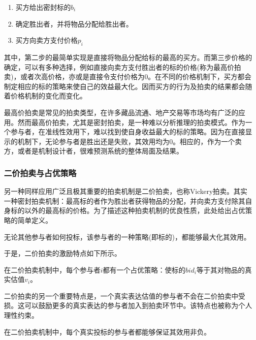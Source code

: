\documentclass[promaster]{thesis-uestc}
\begin{document}
\begin{enumerate}
    \item 买方给出密封标的$b_i$
    \item 确定胜出者，并将物品分配给胜出者。
    \item 买方向卖方支付价格$p_i$
\end{enumerate} 

其中，第二步的最简单实现是直接将物品分配给标的最高的买方。而第三步价格的确定，可以有多种选择，例如直接向卖方支付胜出者的标的价格(称为最高价拍卖)，或者次高价格，亦或是直接令支付价格为0。在不同的价格机制下，买方都会制定相应的标的策略来使自己的效益最大化。因而买方的行为及拍卖的结果都会随着价格机制的变化而变化。

最高价拍卖是常见的拍卖类型，在许多藏品流通、地产交易等市场均有广泛的应用。然而最高价拍卖，尤其是密封拍卖，是一种难以分析推理的拍卖模式。作为一个参与者，在准线性效用下，难以找到使自身收益最大的标的策略。因为在直接显示的机制下，无论参与者是胜出还是失败，其效用均为0。相应的，作为一个卖方，或者是机制设计者，很难预测系统的整体局面及结果。

\subsubsection{二价拍卖与占优策略}
 另一种同样应用广泛且极其重要的拍卖机制是二价拍卖，也称Vickery拍卖。其实一种密封拍卖机制：最高标的者作为胜出者获得物品的分配，并向卖方支付除其自身标的以外的最高标的价格。为了描述这种拍卖机制的优良性质，此处给出占优策略的简单定义。
 
 \begin{definition}[占优策略]
     无论其他参与者如何投标，该参与者的一种策略(即标的)，都能够最大化其效用。
 \end{definition}
 
 于是，二价拍卖的激励特点如下所示。
 
 \begin{corollary}[二价拍卖中的激励]
     在二价拍卖机制中，每个参与者$i$都有一个占优策略：使标的$bid_i$等于其对物品的真实估值$v_i$。
 \end{corollary}

二价拍卖的另一个重要特点是，一个真实表达估值的参与者不会在二价拍卖中受损。这可以鼓励更多的真实表达的参与者加入到拍卖环节中。该特点也被称为个人理性约束。

\begin{corollary}[效用非负性]
    在二价拍卖机制中，每个真实投标的参与者都能够保证其效用非负。
\end{corollary}
\end{document}
